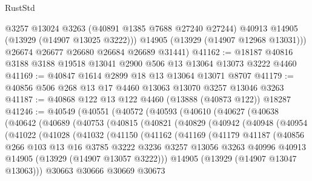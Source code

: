 \begin{lexlean}{RustStd}
\begin{coremodule}
          @3257
          @13024
          @3263
          (@40891 @1385 @7688 @27240 @27244)
          @40913
          @14905
          (@13929 (@14907 @13025 @3222)))
        @14905
        (@13929 (@14907 @12968 @13031)))
      @26674
      @26677
      @26680
      @26684
      @26689
      @31441)
@41162 := @18187 @40816 @3188 @3188 @19518 @13041 @2900 @506 @13 @13064 @13073 @3222 @4460
@41169 := @40847 @1614 @2899 @18 @13 @13064 @13071 @8707
@41179 := @40856 @506 @268 @13 @17 @4460 @13063 @13070 @3257 @13046 @3263
@41187 := @40868 @122 @13 @122 @4460 (@13888 (@40873 @122)) @18287
@41246 := @40549
    (@40551
      (@40572
        (@40593
          (@40610
            (@40627
              (@40638
                (@40642
                  (@40689
                    (@40753
                      (@40815
                        (@40821
                          (@40829
                            (@40942
                              (@40948
                                (@40954
                                  (@41022
                                    (@41028
                                      (@41032
                                        (@41150
                                          (@41162
                                            (@41169
                                              (@41179
                                                @41187
                                                (@40856
                                                  @266
                                                  @103
                                                  @13
                                                  @16
                                                  @3785
                                                  @3222
                                                  @3236
                                                  @3257
                                                  @13056
                                                  @3263
                                                  @40996
                                                  @40913
                                                  @14905
                                                  (@13929 (@14907 @13057 @3222)))
                                                @14905
                                                (@13929 (@14907 @13047 @13063)))
                                              @30663
                                              @30666
                                              @30669
                                              @30673

\end{coremodule}
\end{lexlean}
